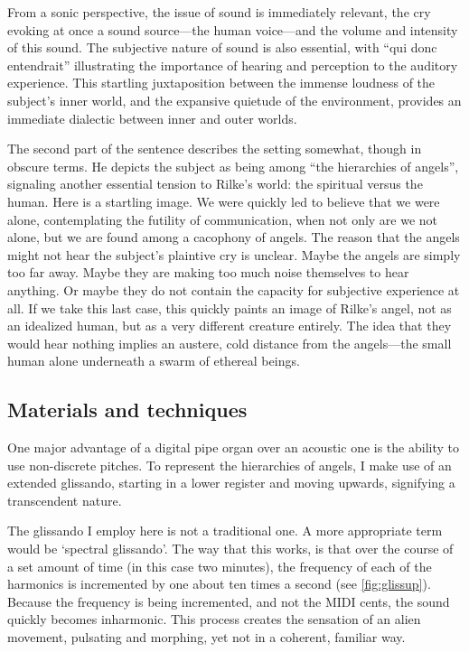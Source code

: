 \documentclass[12pt,twoside,maitrise]{dms_ks}
\theoremstyle{definition}
\begin{document}
{From a sonic perspective, the issue of sound is immediately relevant, the cry evoking at once a sound source---the human voice---and the volume and intensity of this sound.
The subjective nature of sound is also essential, with “qui donc entendrait” illustrating the importance of hearing and perception to the auditory experience.
This startling juxtaposition between the immense loudness of the subject's inner world, and the expansive quietude of the environment, provides an immediate dialectic between inner and outer worlds.

The second part of the sentence describes the setting somewhat, though in obscure terms.
He depicts the subject as being among “the hierarchies of angels”, signaling another essential tension to Rilke's world: the spiritual versus the human.
Here is a startling image.
We were quickly led to believe that we were alone, contemplating the futility of communication, when not only are we not alone, but we are found among a cacophony of angels.
The reason that the angels might not hear the subject's plaintive cry is unclear. 
Maybe the angels are simply too far away.
Maybe they are making too much noise themselves to hear anything.
Or maybe they do not contain the capacity for subjective experience at all.
If we take this last case, this quickly paints an image of Rilke's angel, not as an idealized human, but as a very different creature entirely.
The idea that they would hear nothing implies an austere, cold distance from the angels---the small human alone underneath a swarm of ethereal beings.

\subsection{Materials and techniques}

One major advantage of a digital pipe organ over an acoustic one is the ability to use non-discrete pitches.
To represent the hierarchies of angels, I make use of an extended glissando, starting in a lower register and moving upwards, signifying a transcendent nature.

The glissando I employ here is not a traditional one. 
A more appropriate term would be `spectral glissando'. 
The way that this works, is that over the course of a set amount of time (in this case two minutes), the frequency of each of the harmonics is incremented by one about ten times a second (see \cref{fig:glissup}).
Because the frequency is being incremented, and not the MIDI cents, the sound quickly becomes inharmonic.
This process creates the sensation of an alien movement, pulsating and morphing, yet not in a coherent, familiar way.

}
\end{document}
